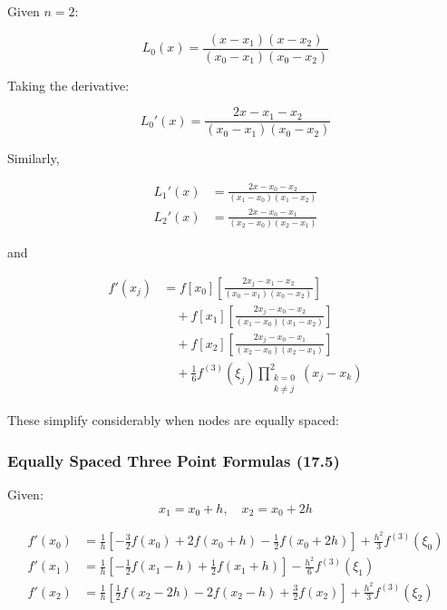 Given \( n = 2 \):

\[
L_0(x) = \frac{(x - x_1)(x - x_2)}{(x_0 - x_1)(x_0 - x_2)}
\]

Taking the derivative:

\[
L_0'(x) = \frac{2x - x_1 - x_2}{(x_0 - x_1)(x_0 - x_2)}
\]

Similarly,

\begin{align*}
    L_1'(x) &= \frac{2x - x_0 - x_2}{(x_1 - x_0)(x_1 - x_2)} \\[10pt]
    L_2'(x) &= \frac{2x - x_0 - x_1}{(x_2 - x_0)(x_2 - x_1)}
\end{align*}

\noindent and

\begin{align*}
    f'(x_j) &= f[x_0] \left[ \frac{2x_j - x_1 - x_2}{(x_0 - x_1)(x_0 - x_2)} \right] \\[10pt]
    &\quad + f[x_1] \left[ \frac{2x_j - x_0 - x_2}{(x_1 - x_0)(x_1 - x_2)} \right] \\[10pt]
    &\quad + f[x_2] \left[ \frac{2x_j - x_0 - x_1}{(x_2 - x_0)(x_2 - x_1)} \right] \\[10pt]
    &\quad + \frac{1}{6} f^{(3)}(\xi_j) \prod_{\substack{k=0 \\ k \neq j}}^{2} (x_j - x_k)
\end{align*}

These simplify considerably when nodes are equally spaced:

\subsubsection{Equally Spaced Three Point Formulas (17.5)}\label{sec:equally_spaced_three_point_formulas}

Given:
\[
x_1 = x_0 + h, \quad x_2 = x_0 + 2h
\]

\begin{align}
    f'(x_0) &= \frac{1}{h} \left[ -\frac{3}{2} f(x_0) + 2f(x_0 + h) - \frac{1}{2} f(x_0 + 2h) \right] 
    + \frac{h^2}{3} f^{(3)}(\xi_0)
    \label{eq:three_point_formula_1}\\[10pt] 
    f'(x_1) &= \frac{1}{h} \left[ -\frac{1}{2} f(x_1 - h) + \frac{1}{2} f(x_1 + h) \right] 
    - \frac{h^2}{6} f^{(3)}(\xi_1) 
    \label{eq:three_point_formula_2}\\[10pt]
    f'(x_2) &= \frac{1}{h} \left[ \frac{1}{2} f(x_2 - 2h) - 2f(x_2 - h) + \frac{3}{2} f(x_2) \right] 
    + \frac{h^2}{3} f^{(3)}(\xi_2)
    \label{eq:three_point_formula_3}
\end{align}

